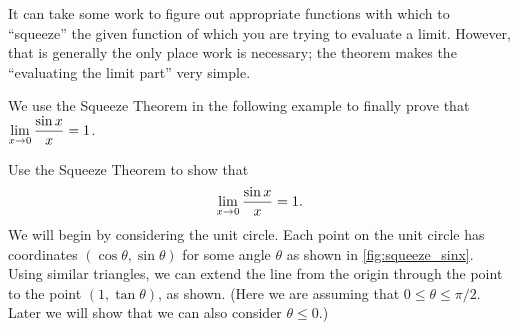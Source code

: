 
It can take some work to figure out appropriate functions with which to ``squeeze'' the given function of which you are trying to evaluate a limit. However, that is generally the only place work is necessary; the theorem makes the ``evaluating the limit part'' very simple. 

We use the Squeeze Theorem in the following example to finally prove that $\displaystyle \lim_{x\to 0} \frac{\sin x}{x} = 1$.

\begin{example}\label{ex_limit_sinx_prove}%
Use the Squeeze Theorem to show that
\[\displaystyle \lim_{x\to 0} \frac{\sin x}{x} = 1.\]
\solution
We will begin by considering the unit circle. Each point on the unit circle has coordinates $(\cos \theta,\sin \theta)$ for some angle $\theta$ as shown in \autoref{fig:squeeze_sinx}. Using similar triangles, we can extend the line from the origin through the point to the point $(1,\tan \theta)$, as shown. (Here we are assuming that $0\leq \theta \leq \pi/2$. Later we will show that we can also consider $\theta \leq 0$.)



\end{example}
